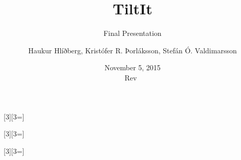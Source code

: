 
\title{TiltIt}
\subtitle{Final Presentation}
\author[H.H., K.R.Þ., S.Ó.V.]{Haukur Hlíðberg, Kristófer R. Þorláksson, Stefán Ó. Valdimarsson}
\date{November 5, 2015\\ Rev~\svnrev{}} %
\graphicspath{{graphics/}{graphics}}
\newcommand{\bookcite}{\parencite{carryer2011IntroMechatronics}\xspace}
\newcommand{\cg}[2][0.8]{\centering\texttt{[image: \#2]}}
\newcommand{\bookcap}[1]{#1\bookcite}
[3][3=]{}
[3][3=]{}
[3][3=]{}
\newcommand{\twocol}[2]{
\begin{columns}
    \begin{column}{.5\linewidth}
    #1
        \end{column}
        \begin{column}{.5\linewidth}
        #2
        \end{column}
\end{columns}
}
\renewcommand{\d}[1]{\;\textsf{d}#1}
\newcommand{\pd}[1]{\partial #1}
\newcommand{\D}{\;\textsf{D}}
\providecommand{\e}[1]{\ensuremath{\times 10^{#1}}}


\usepackage{tabularx}


\usepackage{booktabs}

